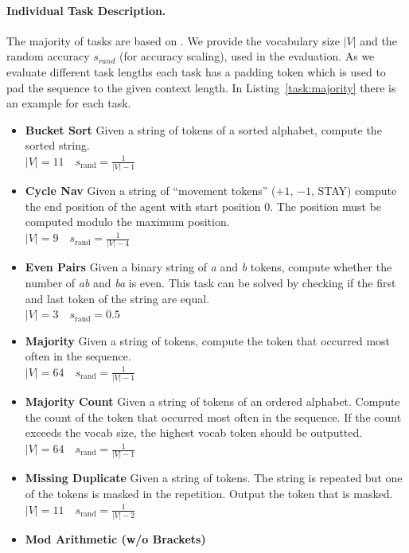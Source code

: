 \documentclass[dvipsnames]{article}
\begin{document}
\begin{appendix}
\paragraph{Individual Task Description.}
The majority of tasks are based on \citet{Deletang:23}.
We provide the vocabulary size $|V|$ and the random accuracy $s_{rand}$ (for accuracy scaling), used in the evaluation.
As we evaluate different task lengths each task has a padding token which is used to pad the sequence to the given context length.
In Listing~\ref{task:majority} there is an example for each task.
\begin{itemize}
    \item\textbf{Bucket Sort}
    Given a string of tokens of a sorted alphabet, compute the sorted string. \\
    $|V|=11 \quad s_{\text{rand}}=\frac{1}{|V| - 1}$
    \item\textbf{Cycle Nav}
    Given a string of ``movement tokens'' ($+1$, $-1$, STAY) compute the end position of the agent with start position 0. The position must be computed modulo the maximum position. \\
    $|V|=9 \quad s_{\text{rand}}=\frac{1}{|V|-4}$
    \item\textbf{Even Pairs}
    Given a binary string of \textit{a} and \textit{b} tokens, compute whether the number of \textit{ab} and \textit{ba} is even.
    This task can be solved by checking if the first and last token of the string are equal. \\
    $|V|=3 \quad s_{\text{rand}}=0.5$
    \item\textbf{Majority}
    Given a string of tokens, compute the token that occurred most often in the sequence.\\
    $|V|=64 \quad s_{\text{rand}}=\frac{1}{|V| - 1}$
    \item\textbf{Majority Count}
    Given a string of tokens of an ordered alphabet. Compute the count of the token that occurred most often in the sequence. If the count exceeds the vocab size, the highest vocab token should be outputted.\\
    $|V|=64 \quad s_{\text{rand}}=\frac{1}{|V| - 1}$
    \item\textbf{Missing Duplicate}
    Given a string of tokens. The string is repeated but one of the tokens is masked in the repetition. Output the token that is masked. \\
    $|V|=11 \quad s_{\text{rand}}=\frac{1}{|V| - 2}$
    \item\textbf{Mod Arithmetic (w/o Brackets)}

\end{itemize}
\end{appendix}
\end{document}
